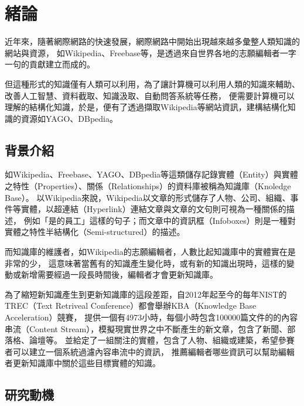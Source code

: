 \chapter{緒論}
\label{c:intro}

近年來，隨著網際網路的快速發展，網際網路中開始出現越來越多彙整人類知識的網站與資源，
如Wikipedia、Freebase等，是透過來自世界各地的志願編輯者一字一句的貢獻建立而成的。

但這種形式的知識僅有人類可以利用，為了讓計算機可以利用人類的知識來輔助、改善人工智慧、資料截取、知識汲取、自動問答系統等任務，
便需要計算機可以理解的結構化知識，於是，便有了透過擷取Wikipedia等網站資訊，建構結構化知識的資源如YAGO、DBpedia。



\section{背景介紹}
如Wikipedia、Freebase、YAGO、DBpedia等這類儲存記錄實體（Entity）與實體之特性（Properties）、關係（Relationships）的資料庫被稱為知識庫（Knoledge Base）。
以Wikipedia來說，Wikipedia以文章的形式儲存了人物、公司、組織、事件等實體，以超連結（Hyperlink）連結文章與文章的文句則可視為一種關係的描述，
例如「是的員工」這樣的句子；而文章中的資訊框（Infoboxes）則是一種對實體之特性半結構化（Semi-structured）的描述。    

而知識庫的維護者，如Wikipedia的志願編輯者，人數比起知識庫中的實體實在是非常的少，
這意味著當舊有的知識產生變化時，或有新的知識出現時，這樣的變動或新增需要經過一段長時間後，編輯者才會更新知識庫。

為了縮短新知識產生到更新知識庫的這段差距，自2012年起至今的每年NIST的TREC（Text Retriveal Conference）都會舉辦KBA（Knowledge Base Acceleration）競賽，
提供一個有4973小時，每個小時包含100000篇文件的的內容串流（Content Stream），模擬現實世界之中不斷產生的新文章，包含了新聞、部落格、論壇等。
並給定了一組關注的實體，包含了人物、組織或建築，希望參賽者可以建立一個系統過濾內容串流中的資訊，
推薦編輯者哪些資訊可以幫助編輯者更新知識庫中關於這些目標實體的知識。


\section{研究動機}




